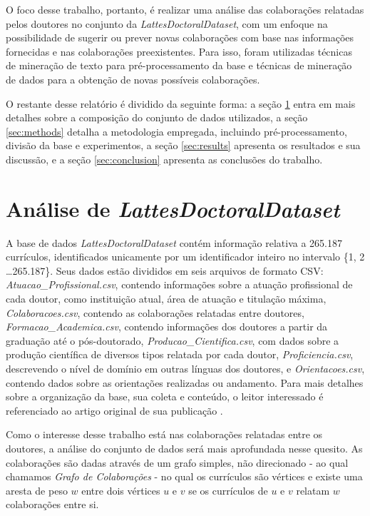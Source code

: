 \documentclass[12pt]{article}
\begin{document}
O foco desse trabalho, portanto, é realizar uma análise das colaborações relatadas pelos doutores no conjunto da \emph{LattesDoctoralDataset}, com um enfoque na possibilidade de sugerir ou prever novas colaborações com base nas informações fornecidas e nas colaborações preexistentes.
Para isso, foram utilizadas técnicas de mineração de texto para pré-processamento da base e técnicas de mineração de dados para a obtenção de novas possíveis colaborações.

O restante desse relatório é dividido da seguinte forma: a seção \ref{sec:dataset} entra em mais detalhes sobre a composição do conjunto de dados utilizados, a seção \ref{sec:methods} detalha a metodologia empregada, incluindo pré-processamento, divisão da base e experimentos, a seção \ref{sec:results} apresenta os resultados e sua discussão, e a seção \ref{sec:conclusion} apresenta as conclusões do trabalho.

\section{Análise de \emph{LattesDoctoralDataset}}
\label{sec:dataset}

A base de dados \emph{LattesDoctoralDataset} contém informação relativa a 265.187 currículos, identificados unicamente por um identificador inteiro no intervalo \{1, 2 \dots 265.187\}.
Seus dados estão divididos em seis arquivos de formato CSV: \textit{Atuacao\_Profissional.csv}, contendo informações sobre a atuação profissional de cada doutor, como instituição atual, área de atuação e titulação máxima, \textit{Colaboracoes.csv}, contendo as colaborações relatadas entre doutores, \textit{Formacao\_Academica.csv}, contendo informações dos doutores a partir da graduação até o pós-doutorado, \textit{Producao\_Cientifica.csv}, com dados sobre a produção científica de diversos tipos relatada por cada doutor, \textit{Proficiencia.csv}, descrevendo o nível de domínio em outras línguas dos doutores,  e \textit{Orientacoes.csv}, contendo dados sobre as orientações realizadas ou andamento.
Para mais detalhes sobre a organização da base, sua coleta e conteúdo, o leitor interessado é referenciado ao artigo original de sua publicação \cite{lattes-dataset}.

Como o interesse desse trabalho está nas colaborações relatadas entre os doutores, a análise do conjunto de dados será mais aprofundada nesse quesito.
As colaborações são dadas através de um grafo simples, não direcionado - ao qual chamamos \textit{Grafo de Colaborações} - no qual os currículos são vértices e existe uma aresta de peso $w$ entre dois vértices $u$ e $v$ se os currículos de $u$ e $v$ relatam $w$ colaborações entre si.
\end{document}
